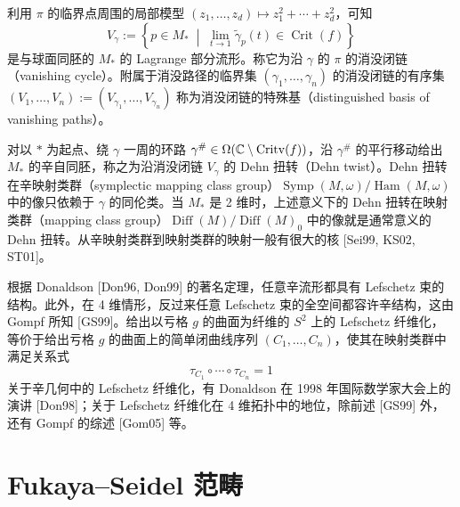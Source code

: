 利用 $\pi$ 的临界点周围的局部模型 $(z_1,\ldots,z_d)\mapsto z_1^2+\cdots+z_d^2$，可知
\begin{equation}
  V_\gamma := \left\{ p\in M_* \;\middle|\; \lim_{t\to1}\tilde\gamma_p(t)\in\operatorname{Crit}(f) \right\}
  \tag{12.1}
\end{equation}
是与球面同胚的 $M_*$ 的 Lagrange 部分流形。称它为沿 $\gamma$ 的 $\pi$ 的消没闭链（vanishing cycle）。附属于消没路径的临界集 $(\gamma_1,\ldots,\gamma_n)$ 的消没闭链的有序集 $(V_1,\ldots,V_n):=(V_{\gamma_1},\ldots,V_{\gamma_n})$ 称为消没闭链的特殊基（distinguished basis of vanishing paths）。


对以 $*$ 为起点、绕 $\gamma$ 一周的环路 $\gamma^\#\in\Omega(\mathbb{C}\setminus\operatorname{Critv}(f))$，沿 $\gamma^\#$ 的平行移动给出 $M_*$ 的辛自同胚，称之为沿消没闭链 $V_\gamma$ 的 Dehn 扭转（Dehn twist）。Dehn 扭转在辛映射类群（symplectic mapping class group）$\operatorname{Symp}(M,\omega)/\operatorname{Ham}(M,\omega)$ 中的像只依赖于 $\gamma$ 的同伦类。当 $M_*$ 是 2 维时，上述意义下的 Dehn 扭转在映射类群（mapping class group）$\operatorname{Diff}(M)/\operatorname{Diff}(M)_0$ 中的像就是通常意义的 Dehn 扭转。从辛映射类群到映射类群的映射一般有很大的核 [Sei99, KS02, ST01]。

根据 Donaldson [Don96, Don99] 的著名定理，任意辛流形都具有 Lefschetz 束的结构。此外，在 4 维情形，反过来任意 Lefschetz 束的全空间都容许辛结构，这由 Gompf 所知 [GS99]。给出以亏格 $g$ 的曲面为纤维的 $S^2$ 上的 Lefschetz 纤维化，等价于给出亏格 $g$ 的曲面上的简单闭曲线序列 $(C_1,\ldots,C_n)$，使其在映射类群中满足关系式
\begin{equation}
  \tau_{C_1}\circ\cdots\circ\tau_{C_n}=1
  \tag{12.2}
\end{equation}
关于辛几何中的 Lefschetz 纤维化，有 Donaldson 在 1998 年国际数学家大会上的演讲 [Don98]；关于 Lefschetz 纤维化在 4 维拓扑中的地位，除前述 [GS99] 外，还有 Gompf 的综述 [Gom05] 等。

\section{Fukaya–Seidel 范畴}

